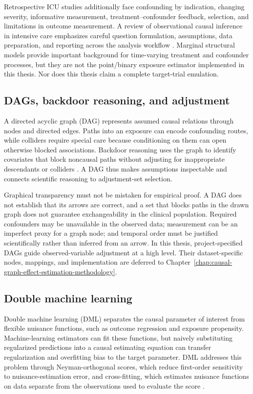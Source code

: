 Retrospective ICU studies additionally face confounding by indication, changing severity, informative measurement, treatment--confounder feedback, selection, and limitations in outcome measurement.  A review of observational causal inference in intensive care emphasizes careful question formulation, assumptions, data preparation, and reporting across the analysis workflow \cite{smit_2023_causal_inference_icu_scoping_review}.  Marginal structural models provide important background for time-varying treatment and confounder processes, but they are not the point/binary exposure estimator implemented in this thesis.  Nor does this thesis claim a complete target-trial emulation.

\subsection{DAGs, backdoor reasoning, and adjustment}

A directed acyclic graph (DAG) represents assumed causal relations through nodes and directed edges.  Paths into an exposure can encode confounding routes, while colliders require special care because conditioning on them can open otherwise blocked associations.  Backdoor reasoning uses the graph to identify covariates that block noncausal paths without adjusting for inappropriate descendants or colliders \cite{pearl_1995_causal_diagrams}.  A DAG thus makes assumptions inspectable and connects scientific reasoning to adjustment-set selection.

Graphical transparency must not be mistaken for empirical proof.  A DAG does not establish that its arrows are correct, and a set that blocks paths in the drawn graph does not guarantee exchangeability in the clinical population.  Required confounders may be unavailable in the observed data; measurement can be an imperfect proxy for a graph node; and temporal order must be justified scientifically rather than inferred from an arrow.  In this thesis, project-specified DAGs guide observed-variable adjustment at a high level.  Their dataset-specific nodes, mappings, and implementation are deferred to Chapter~\ref{chap:causal-graph-effect-estimation-methodology}.

\subsection{Double machine learning}

Double machine learning (DML) separates the causal parameter of interest from flexible nuisance functions, such as outcome regression and exposure propensity.  Machine-learning estimators can fit these functions, but naively substituting regularized predictions into a causal estimating equation can transfer regularization and overfitting bias to the target parameter.  DML addresses this problem through Neyman-orthogonal scores, which reduce first-order sensitivity to nuisance-estimation error, and cross-fitting, which estimates nuisance functions on data separate from the observations used to evaluate the score \cite{chernozhukov2018dml}.

